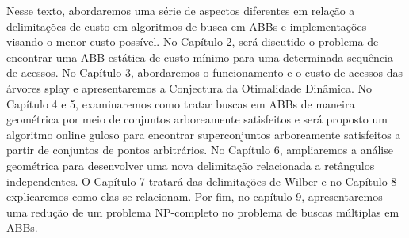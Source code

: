 
Nesse texto, abordaremos uma série de aspectos diferentes em relação a delimitações de custo em algoritmos de busca em ABBs e implementações visando o menor custo possível. No Capítulo 2, será discutido o problema de encontrar uma ABB estática de custo mínimo para uma determinada sequência de acessos. No Capítulo 3, abordaremos o funcionamento e o custo de acessos das árvores splay e apresentaremos a Conjectura da Otimalidade Dinâmica. 
No Capítulo 4 e 5, examinaremos como tratar buscas em ABBs de maneira geométrica por meio de conjuntos arboreamente satisfeitos e será proposto um algoritmo online guloso para encontrar superconjuntos arboreamente satisfeitos a partir de conjuntos de pontos arbitrários.
No Capítulo 6, ampliaremos a análise geométrica para desenvolver uma nova delimitação relacionada a retângulos independentes. O Capítulo 7 tratará das delimitações de Wilber e no Capítulo 8 explicaremos como elas se relacionam. Por fim, no capítulo 9, apresentaremos uma redução de um problema NP-completo no problema de buscas múltiplas em ABBs.